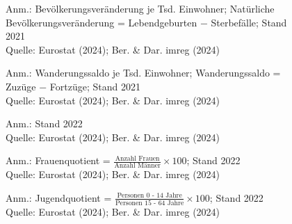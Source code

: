 \begin{figure}[p]
	{\centering {}}
	\label{map:natbevrate}
	\begin{spacing}{1} \scriptsize
		Anm.: Bevölkerungsveränderung je Tsd. Einwohner; Natürliche Bevölkerungsveränderung = Lebendgeburten $-$ Sterbefälle; Stand 2021\\
		Quelle: Eurostat (2024); Ber. \& Dar. imreg (2024) \end{spacing}
\end{figure}


\begin{figure}[p]
	{\centering {}}
	\label{map:wanderung}
	\begin{spacing}{1} \scriptsize
		Anm.: Wanderungssaldo je Tsd. Einwohner; Wanderungssaldo = Zuzüge $-$ Fortzüge; Stand 2021\\
		Quelle: Eurostat (2024); Ber. \& Dar. imreg (2024) \end{spacing}
\end{figure}


\begin{figure}[p]
	{\centering {}}
	\label{map:alter}
	\begin{spacing}{1} \scriptsize
		Anm.: Stand 2022\\
		Quelle: Eurostat (2024); Ber. \& Dar. imreg (2024) \end{spacing}
\end{figure}


\begin{figure}[p]
	{\centering {}}
	\label{map:frauen}
	\begin{spacing}{1} \scriptsize
		Anm.: Frauenquotient = $\frac{\text{Anzahl Frauen}}{\text{Anzahl Männer}} \times 100$; Stand 2022\\
		Quelle: Eurostat (2024); Ber. \& Dar. imreg (2024) \end{spacing}
\end{figure}


\begin{figure}[p]
	{\centering {}}
	\label{map:jugend}
	\begin{spacing}{1} \scriptsize
		Anm.: Jugendquotient = $\frac{\text{Personen 0 - 14 Jahre}}{\text{Personen 15 - 64 Jahre}} \times 100$; Stand 2022\\
		Quelle: Eurostat (2024); Ber. \& Dar. imreg (2024) \end{spacing}
\end{figure}


